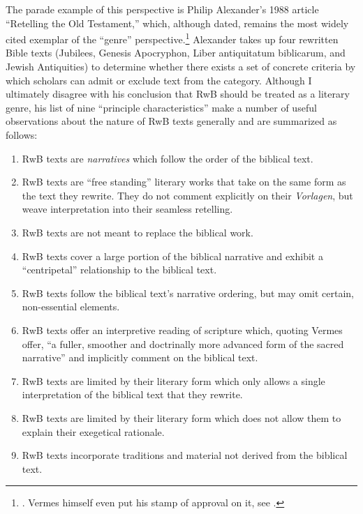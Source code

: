 The parade example of this perspective is Philip Alexander's 1988
article ``Retelling the Old Testament,'' which, although dated, remains
the most widely cited exemplar of the ``genre'' perspective.\footnote{\textcite{alexander_carson-williamson1988}.
  Vermes himself even put his stamp of approval on it, see
  \textcite[4]{vermes_zsengeller2014}.} Alexander takes up four
rewritten Bible texts (Jubilees, Genesis Apocryphon,
Liber antiquitatum biblicarum, and Jewish Antiquities) to determine
whether there exists a set of concrete criteria by which scholars can
admit or exclude text from the category. Although I ultimately disagree
with his conclusion that RwB should be treated as a literary genre, his
list of nine ``principle characteristics'' make a number of useful
observations about the nature of RwB texts generally and are summarized
as follows:

\begin{enumerate}
\def\labelenumi{\arabic{enumi}.}
\tightlist
\item
  RwB texts are \emph{narratives} which follow the order of the biblical
  text.
\item
  RwB texts are ``free standing'' literary works that take on the same
  form as the text they rewrite. They do not comment explicitly on their
  \emph{Vorlagen}, but weave interpretation into their seamless
  retelling.
\item
  RwB texts are not meant to replace the biblical work.
\item
  RwB texts cover a large portion of the biblical narrative and exhibit
  a ``centripetal'' relationship to the biblical text.
\item
  RwB texts follow the biblical text's narrative ordering, but may omit
  certain, non-essential elements.
\item
  RwB texts offer an interpretive reading of scripture which, quoting
  Vermes offer, ``a fuller, smoother and doctrinally more advanced form
  of the sacred narrative''\autocite[Citing Vermes in][305]{schurer1986}
  and implicitly comment on the biblical text.
\item
  RwB texts are limited by their literary form which only allows a
  single interpretation of the biblical text that they rewrite.
\item
  RwB texts are limited by their literary form which does not allow them
  to explain their exegetical rationale.
\item
  RwB texts incorporate traditions and material not derived from the
  biblical text.
\end{enumerate}


